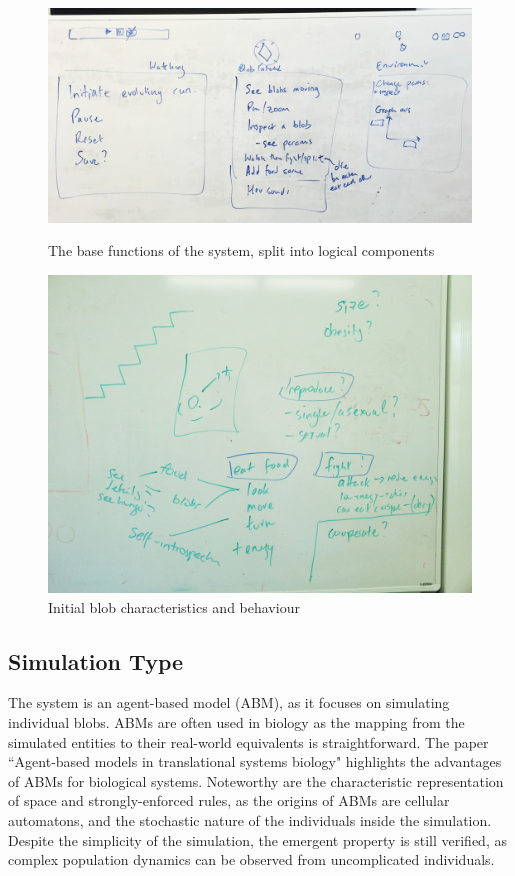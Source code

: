 \begin{figure}[!th]
	\centering
	\begin{minipage}[b]{0.40\textwidth}
		\includegraphics[scale=0.34]{images/initial2}
		\caption{\label{fig:initial2}The base functions of the system, split into logical components}
	\end{minipage}
	\hfill
	\begin{minipage}[b]{0.45\textwidth}
		\includegraphics[scale=0.07]{images/initial3}
		\caption{\label{fig:initial3}Initial blob characteristics and behaviour}
	\end{minipage}
\end{figure}

\subsection{Simulation Type}
The system is an agent-based model (ABM), as it focuses on simulating individual blobs. ABMs are often used in biology as the mapping from the simulated entities to their real-world equivalents is straightforward. The paper ``Agent-based models in translational systems biology"\cite{an2009agent} highlights the advantages of ABMs for biological systems. Noteworthy are the characteristic representation of space and strongly-enforced rules, as the origins of ABMs are cellular automatons, and the stochastic nature of the individuals inside the simulation. Despite the simplicity of the simulation, the emergent property is still verified, as complex population dynamics can be observed from uncomplicated individuals.

